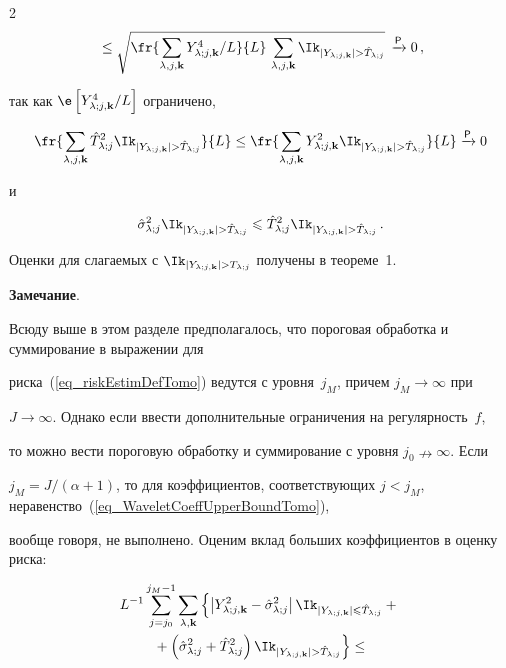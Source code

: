 \begin{multicols}{2}
\begin{multline*}
{}\leq \sqrt{ \fr{\sumljk \Yljk^4/L}{L} \, \sumljk \indYjkghTj } \,\xrightarrow{\textsf{P}} 0\,,


\end{multline*}


так как $\e\left[ \Yljk^4/L \right]$ ограничено,


\begin{equation*}


\fr{ \sumljk \hTlj^2 \indYjkghTj }{L} \leq \fr{ \sumljk \Yljk^2 \indYjkghTj }{L} \xrightarrow{\mathsf{P}} 0


\end{equation*}


и


\begin{equation*}


\hslj\indYjkghTj \leqslant \hTlj^2\indYjkghTj\,.


\end{equation*}


Оценки для слагаемых с $\indYjkgTj$ получены в теореме~1.





\medskip





\noindent


\textbf{Замечание}. 


Всюду выше в этом разделе предполагалось, что пороговая обработка и суммирование в выражении для 


риска~(\ref{eq_riskEstimDefTomo}) ведутся с уровня~$j_M$, причем $j_M\rightarrow\infty$ при 


$J\rightarrow\infty$. Однако если ввести дополнительные ограничения на регулярность~$f$, 


то можно вести пороговую обработку и суммирование с уровня $j_0\nrightarrow\infty$. Если 


$j_M=J/(\alpha+1)$, то для коэффициентов, соответствующих $j<j_M$, неравенство~(\ref{eq_WaveletCoeffUpperBoundTomo}), 


вообще говоря, не выполнено. Оценим вклад больших коэффициентов в оценку риска:


\begin{multline*}


L^{-1} \sum\limits_{j=j_0}^{j_M-1}\sum\limits_{\lambda,\mathbf{k}} \left\{\left|\Yljk^2-\hslj\right|\indYjklhTj +{}\right.\\


\left.{}+ \left(\hslj+\hTlj^2\right)\indYjkghTj \right\} \leq{}\\



\end{multline*}
\end{multicols}
